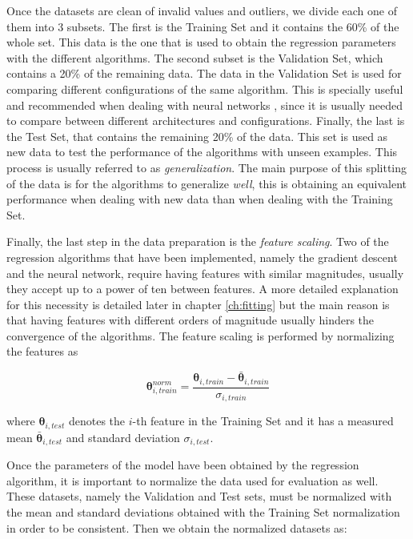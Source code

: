 \documentclass[a4paper, report, oneside, UKenglish]{memoir}
\newcommand{\btheta}{\boldsymbol{\theta}}
\begin{document}
Once the datasets are clean of invalid values and outliers, we divide each one of them into 3 subsets. The first is the Training Set and it contains the 60\% of the whole set. This data is the one that is used to obtain the regression parameters with the different algorithms. The second subset is the Validation Set, which contains a 20\% of the remaining data. The data in the Validation Set is used for comparing different configurations of the same algorithm. This is specially useful and recommended when dealing with neural networks \cite{aggarwal_neural_2018}, since it is usually needed to compare between different architectures and configurations. Finally, the last is the Test Set, that contains the remaining 20\% of the data. This set is used as new data to test the performance of the algorithms with unseen examples. This process is usually referred to as \textit{generalization}. The main purpose of this splitting of the data is for the algorithms to generalize \textit{well}, this is obtaining an equivalent performance when dealing with new data than when dealing with the Training Set.

Finally, the last step in the data preparation is the \textit{feature scaling}. Two of the regression algorithms that have been implemented, namely the gradient descent and the neural network, require having features with similar magnitudes, usually they accept up to a power of ten between features. A more detailed explanation for this necessity is detailed later in chapter \ref{ch:fitting} but the main reason is that having features with different orders of magnitude usually hinders the convergence of the algorithms. The feature scaling is performed by normalizing the features as

\begin{equation}
    \btheta_{i, train}^{norm} = \frac{\btheta_{i, train} - \bar{\btheta}_{i, train}}{\sigma_{i, train}}
\end{equation}

where $\btheta_{i, test}$ denotes the $i$-th feature in the Training Set and it has a measured mean $\bar{\btheta}_{i, test}$ and standard deviation $\sigma_{i, test}$. 

Once the parameters of the model have been obtained by the regression algorithm, it is important to normalize the data used for evaluation as well. These datasets, namely the Validation and Test sets, must be normalized with the mean and standard deviations obtained with the Training Set normalization in order to be consistent. Then we obtain the normalized datasets as:
\end{document}
